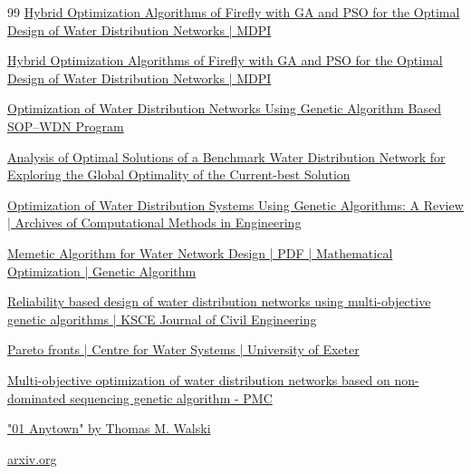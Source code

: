 \documentclass[12pt, a4paper]{article}
\begin{document}
\begin{thebibliography}{99}
	 \href{https://www.mdpi.com/2073-4441/15/10/1906}{Hybrid Optimization Algorithms of Firefly with GA and PSO for the Optimal Design of Water Distribution Networks | MDPI}

	 \href{https://www.mdpi.com/2073-4441/15/10/1906}{Hybrid Optimization Algorithms of Firefly with GA and PSO for the Optimal Design of Water Distribution Networks | MDPI}

	 \href{https://www.mdpi.com/2073-4441/14/6/851}{Optimization of Water Distribution Networks Using Genetic Algorithm Based SOP--WDN Program}

	 \href{https://chijournal.org/H527}{Analysis of Optimal Solutions of a Benchmark Water Distribution Network for Exploring the Global Optimality of the Current-best Solution}

	 \href{https://link.springer.com/article/10.1007/s11831-023-09944-7}{Optimization of Water Distribution Systems Using Genetic Algorithms: A Review | Archives of Computational Methods in Engineering}

	 \href{https://www.scribd.com/document/851139427/A-memetic-algorithm-applied-to-the-design-of-water-distribution-networks}{Memetic Algorithm for Water Network Design | PDF | Mathematical Optimization | Genetic Algorithm}

	 \href{https://link.springer.com/article/10.1007/BF02831784}{Reliability based design of water distribution networks using multi-objective genetic algorithms | KSCE Journal of Civil Engineering}

	 \href{https://www.exeter.ac.uk/research/centres/cws/resources/benchmarks/pareto/}{Pareto fronts | Centre for Water Systems | University of Exeter}

	 \href{https://pmc.ncbi.nlm.nih.gov/articles/PMC9704581/}{Multi-objective optimization of water distribution networks based on non-dominated sequencing genetic algorithm - PMC}

	 \href{https://uknowledge.uky.edu/wdst_models/1/}{"01 Anytown" by Thomas M. Walski}

	 \href{https://arxiv.org/pdf/2503.17167}{arxiv.org}

\end{thebibliography}
\end{document}
